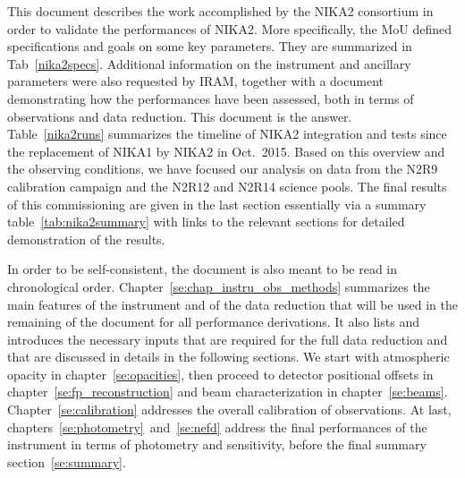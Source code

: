 This document describes the work accomplished by the NIKA2 consortium in order
to validate the performances of NIKA2. More specifically, the MoU defined
specifications and goals on some key parameters. They are summarized in
Tab~\ref{nika2specs}. Additional information on the instrument and ancillary
parameters were also requested by IRAM, together with a document demonstrating
how the performances have been assessed, both in terms of observations and data
reduction. This document is the answer.\\

Table~\ref{nika2runs} summarizes the timeline of NIKA2 integration and tests
since the replacement of NIKA1 by NIKA2 in Oct.~2015. Based on this overview and
the observing conditions, we have focused our analysis on data from
the N2R9 calibration campaign and the N2R12 and N2R14 science pools.
The final results of this commissioning are given in the last section
essentially via a summary table~\ref{tab:nika2summary} with links to the
relevant sections for detailed demonstration of the results.

In order to be self-consistent, the document is also meant to be read in chronological
order. Chapter~\ref{se:chap_instru_obs_methods} summarizes the main features of
the instrument and of the data reduction that will be used in the remaining of
the document for all performance derivations. It also lists and introduces the necessary inputs
that are required for the full data reduction and that are discussed in details
in the following sections.
We start with atmospheric opacity in
chapter~\ref{se:opacities}, then proceed to detector positional offsets in
chapter~\ref{se:fp_reconstruction} and beam characterization in chapter~\ref{se:beams}.
Chapter~\ref{se:calibration} addresses the overall calibration of
observations. At last, chapters~\ref{se:photometry}~and~\ref{se:nefd} address
the final performances of the instrument in terms of photometry and sensitivity,
before the final summary section~\ref{se:summary}.


